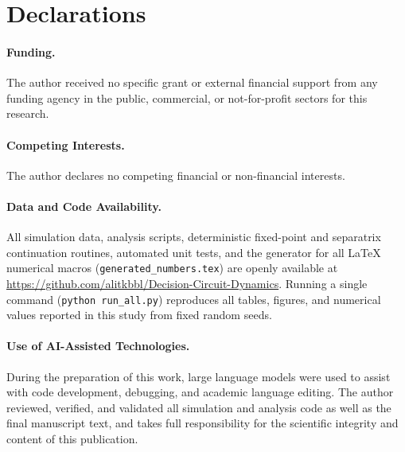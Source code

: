 \documentclass[11pt]{article}
\begin{document}
	\section*{Declarations}
	\paragraph{Funding.} The author received no specific grant or external financial support from any funding agency in the public, commercial, or not-for-profit sectors for this research.
	
	\paragraph{Competing Interests.} The author declares no competing financial or non-financial interests.
	
	\paragraph{Data and Code Availability.} All simulation data, analysis scripts, deterministic fixed-point and separatrix continuation routines, automated unit tests, and the generator for all LaTeX numerical macros (\texttt{generated\_numbers.tex}) are openly available at \url{https://github.com/alitkbbl/Decision-Circuit-Dynamics}. Running a single command (\texttt{python run\_all.py}) reproduces all tables, figures, and numerical values reported in this study from fixed random seeds.
	
	\paragraph{Use of AI-Assisted Technologies.} During the preparation of this work, large language models were used to assist with code development, debugging, and academic language editing. The author reviewed, verified, and validated all simulation and analysis code as well as the final manuscript text, and takes full responsibility for the scientific integrity and content of this publication.
	
	\appendix
\end{document}
